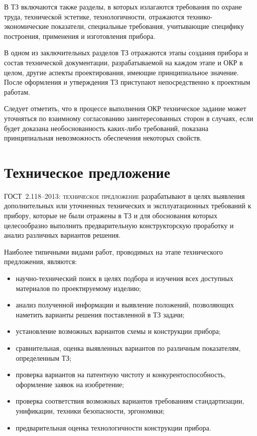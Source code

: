 В ТЗ включаются также разделы, в которых излагаются требования по охране труда, технической эстетике, технологичности, отражаются технико-экономические показатели, специальные требования, учитывающие специфику построения, применения и изготовления прибора.

В одном из заключительных разделов ТЗ отражаются этапы создания прибора и состав технической документации, разрабатываемой на каждом этапе и ОКР в целом, другие аспекты проектирования, имеющие принципиальное значение. После оформления и утверждения ТЗ приступают непосредственно к проектным работам.

Следует отметить, что в процессе выполнения ОКР техническое задание может уточняться по взаимному согласованию заинтересованных сторон в случаях, если будет доказана необоснованность каких-либо требований, показана принципиальная невозможность обеспечения некоторых свойств.

\section{Техническое предложение}

\noindent
ГОСТ~2.118–2013: \textsc{техническое предложение} разрабатывают в целях выявления дополнительных или уточненных технических и эксплуатационных требований к прибору, которые не были отражены в ТЗ и для обоснования которых целесообразно выполнить предварительную конструкторскую проработку и анализ различных вариантов решения.

Наиболее типичными видами работ, проводимых на этапе технического предложения, являются:
\begin{itemize}
	\item научно-технический поиск в целях подбора и изучения всех доступных  материалов по проектируемому изделию;
	\item анализ полученной информации и выявление положений, позволяющих наметить варианты решения поставленной в ТЗ задачи;
	\item установление возможных вариантов схемы и конструкции прибора;
	\item сравнительная, оценка выявленных вариантов по различным показателям, определенным ТЗ;
	\item проверка вариантов на патентную чистоту и конкурентоспособность, оформление заявок на изобретение;
	\item проверка соответствия возможных вариантов требованиям стандартизации, унификации, техники безопасности, эргономики;
	\item предварительная оценка технологичности конструкции прибора.
\end{itemize}

